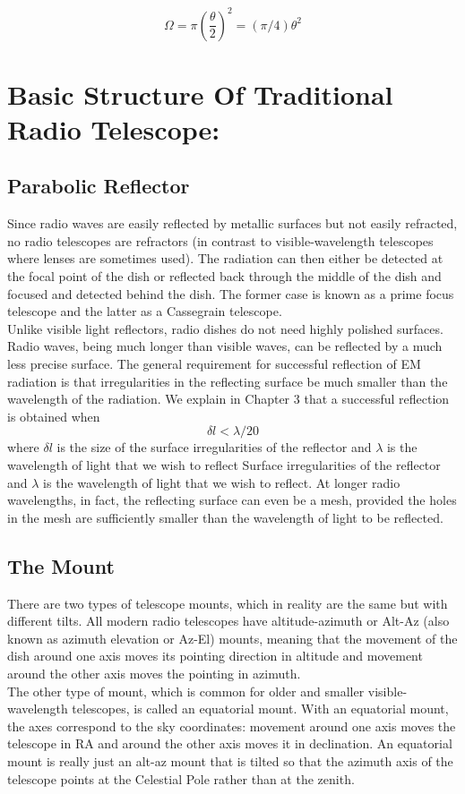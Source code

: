 \documentclass[10pt]{report}
\newcommand{\cc}[1]{\left({#1}\right)}
\begin{document}
\begin{itemize}
\begin{equation}
\Omega=\pi\cc{\frac{\theta}{2}}^2=(\pi/4)\theta^2
\end{equation} 
 
\end{itemize}
\section{Basic Structure Of Traditional Radio Telescope:}
\subsection{Parabolic Reflector}
 Since radio waves are easily reflected by metallic surfaces but not easily refracted, no radio telescopes are refractors (in contrast to visible-wavelength telescopes where lenses are sometimes used).  The radiation can then either be detected at the focal point of the dish or reflected back through the middle of the dish and focused and detected behind the dish. The former case is known as a prime focus telescope and the latter as a Cassegrain telescope.  \\
  Unlike visible light reflectors, radio dishes do not need highly polished surfaces.  Radio waves, being much longer than visible waves, can be reflected by a much less precise surface.  The general requirement for successful reflection of EM radiation is that irregularities in the reflecting surface be much smaller than the wavelength of the radiation.  We explain in Chapter 3 that a successful reflection is obtained when
\begin{equation}
\delta l <\lambda/20
\end{equation}
where $\delta l$ is the size of the surface irregularities of the reflector and $\lambda$ is the wavelength of light that we wish to reflect Surface irregularities of the reflector and $\lambda$ is the wavelength of light that we wish to reflect.  At longer radio wavelengths, in fact, the reflecting surface can even be a mesh, provided the holes in the mesh are sufficiently smaller than the wavelength of light to be reflected. 
\subsection{The Mount}
There are two types of telescope mounts, which in reality are the same but with different tilts.  All modern radio telescopes have altitude-azimuth or Alt-Az (also known as azimuth elevation or Az-El) mounts, meaning that the movement of the dish around one axis moves its pointing direction in altitude and movement around the other axis moves the pointing in azimuth. \\
The other type of mount, which is common for older and smaller visible-wavelength telescopes, is called an equatorial mount.  With an equatorial mount, the axes correspond to the sky coordinates: movement around one axis moves the telescope in RA and around the other axis moves it in declination.  An equatorial mount is really just an alt-az mount that is tilted so that the azimuth axis of the telescope points at the Celestial Pole rather than at the zenith. \\
\end{document}
